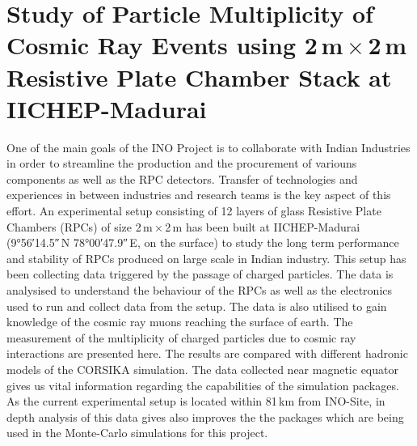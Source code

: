 \chapter{Study of Particle Multiplicity of Cosmic Ray Events using
  2\,m\,$\times$\,2\,m Resistive Plate Chamber Stack at IICHEP-Madurai}

One of the main goals of the INO Project is to collaborate with Indian
Industries in order to streamline the production and the procurement
of variouns components as well as the RPC detectors. Transfer of
technologies and experiences in between industries and research teams
is the key aspect of this effort.
An experimental setup consisting of 12 layers of glass Resistive Plate
Chambers (RPCs) of size 2\,m\,$\times$\,2\,m has been built at
IICHEP-Madurai (\ang{9;56;14.5}\,N \ang{78;00;47.9}\,E, on the surface)
to study the long term performance and stability of RPCs produced on
large scale in Indian industry. This setup has been collecting data
triggered by the passage of charged particles. The data is analysised
to understand the behaviour of the RPCs as well as the electronics
used to run and collect data from the setup. The data is also utilised
to gain knowledge of the cosmic ray muons reaching the surface of
earth. The measurement of the multiplicity of charged particles due to
cosmic ray interactions are presented here. The results are compared
with different hadronic models of the CORSIKA simulation. The data
collected near magnetic equator gives us vital information regarding
the capabilities of the simulation packages. As the current
experimental setup is located within 81\,km from INO-Site, in depth
analysis of this data gives also improves the the packages which are
being used in the Monte-Carlo simulations for this project.

